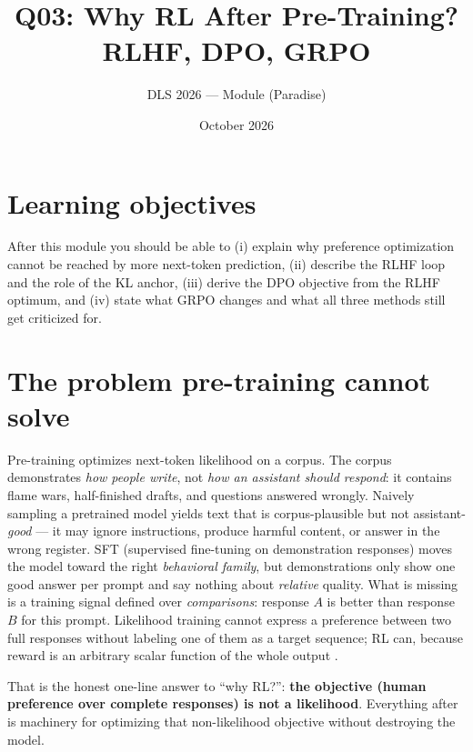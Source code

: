 \documentclass[11pt]{article}
\title{Q03: Why RL After Pre-Training? RLHF, DPO, GRPO}
\author{DLS 2026 --- Module (Paradise)}
\date{October 2026}
\begin{document}
\maketitle

\section*{Learning objectives}
After this module you should be able to (i) explain why preference optimization cannot be reached by more next-token prediction, (ii) describe the RLHF loop and the role of the KL anchor, (iii) derive the DPO objective from the RLHF optimum, and (iv) state what GRPO changes and what all three methods still get criticized for.

\section{The problem pre-training cannot solve}
Pre-training optimizes next-token likelihood on a corpus. The corpus demonstrates \emph{how people write}, not \emph{how an assistant should respond}: it contains flame wars, half-finished drafts, and questions answered wrongly. Naively sampling a pretrained model yields text that is corpus-plausible but not assistant-\emph{good} --- it may ignore instructions, produce harmful content, or answer in the wrong register. SFT (supervised fine-tuning on demonstration responses) moves the model toward the right \emph{behavioral family}, but demonstrations only show one good answer per prompt and say nothing about \emph{relative} quality. What is missing is a training signal defined over \emph{comparisons}: response $A$ is better than response $B$ for this prompt. Likelihood training cannot express a preference between two full responses without labeling one of them as a target sequence; RL can, because reward is an arbitrary scalar function of the whole output \cite{ouyang2022training,christiano2017deep}.

That is the honest one-line answer to ``why RL?'': \textbf{the objective (human preference over complete responses) is not a likelihood}. Everything after is machinery for optimizing that non-likelihood objective without destroying the model.
\end{document}
